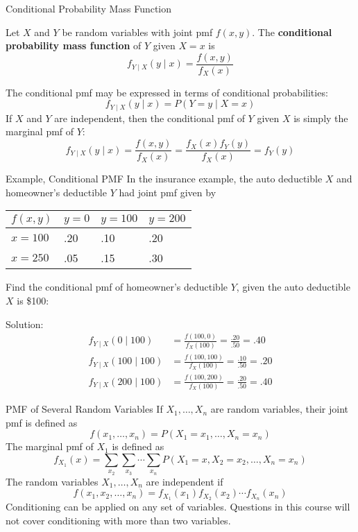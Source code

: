 \documentclass[handout]{beamer}
\begin{document}
\begin{frame}{Conditional Probability Mass Function}
    \begin{block}{}
        Let $X$ and $Y$ be random variables with joint pmf $f(x,y)$. The \textbf{conditional probability mass function} of $Y$ given $X=x$ is
        $$f_{Y\mid X}(y\mid x) = \frac{f(x,y)}{f_X(x)}$$
    \end{block}
    \pause The conditional pmf may be expressed in terms of conditional probabilities:
    $$f_{Y\mid X}(y\mid x) = P(Y=y \mid X=x)$$
    \pause If $X$ and $Y$ are independent, then the conditional pmf of $Y$ given $X$ is simply the marginal pmf of $Y$:
    $$f_{Y\mid X}(y\mid x) = \frac{f(x,y)}{f_X(x)} = \frac{f_X(x)f_Y(y)}{f_X(x)} = f_Y(y)$$
\end{frame}

\begin{frame}{Example, Conditional PMF}
    In the insurance example, the auto deductible $X$ and homeowner's deductible $Y$ had joint pmf given by

    \begin{center}
        \begin{tabular}{l||l|l|l}
            $f(x,y)$ & $y=0$ & $y=100$ & $y=200$ \\ \hline \hline
            $x=100$  & .20   & .10     & .20     \\ \hline
            $x=250$  & .05   & .15     & .30
        \end{tabular}
    \end{center}

    Find the conditional pmf of homeowner's deductible $Y$, given the auto deductible $X$ is \$100:

    \vspace{.2cm}
    \pause
    Solution:
    \begin{align*}
        f_{Y\mid X}(0 \mid 100)   & = \frac{f(100,0)}{f_X(100)} = \frac{.20}{.50} = .40   \\
        f_{Y\mid X}(100 \mid 100) & = \frac{f(100,100)}{f_X(100)} = \frac{.10}{.50} = .20 \\
        f_{Y\mid X}(200 \mid 100) & = \frac{f(100,200)}{f_X(100)} = \frac{.20}{.50} = .40
    \end{align*}
\end{frame}

\begin{frame}{PMF of Several Random Variables}
    If $X_1, \dots, X_n$ are random variables, their joint pmf is defined as
    $$f(x_1,\dots,x_n) =P(X_1=x_1, \dots, X_n=x_n)$$
    \pause The marginal pmf of $X_1$ is defined as
    $$f_{X_1}(x)= \sum_{x_2}\sum_{x_3}\cdots\sum_{x_n} P(X_1=x, X_2=x_2,\dots,X_n=x_n)$$
    \pause The random variables $X_1,\dots,X_n$ are independent if
    $$f(x_1,x_2,\dots,x_n) = f_{X_1}(x_1)f_{X_2}(x_2)\cdots f_{X_n}(x_n)$$
    \pause Conditioning can be applied on any set of variables. Questions in this course will not cover conditioning with more than two variables.
\end{frame}
\end{document}
